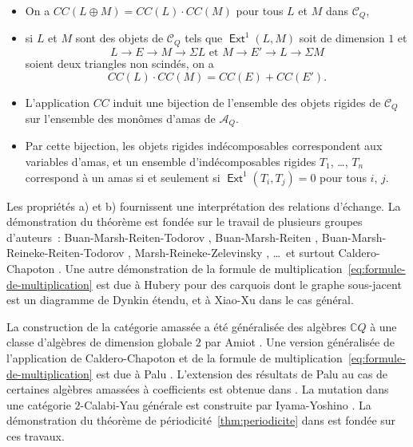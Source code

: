 \documentclass[brochure,12pt]{bourbaki}
\numberwithin{equation}{subsection}
\numberwithin{theorem}{section}
\newcommand{\opname}[1]{\operatorname{\mathsf{#1}}}
\newcommand{\C}{\mathbb{C}}
\newcommand{\Ext}{\opname{Ext}}
\newcommand{\ca}{{\mathcal A}}
\newcommand{\cc}{{\mathcal C}}
\begin{document}
\begin{theo} \label{thm:categorie-amassee-bijection}
\begin{itemize}
\item[a)] On a $CC(L\oplus M) = CC(L)\cdot CC(M)$ pour tous $L$ et $M$ dans $\cc_Q$,
\item[b)] si $L$ et $M$ sont des objets de $\cc_Q$ tels que $\Ext^1(L,M)$ soit de
dimension $1$ et
\[
L \to E \to M \to \Sigma L \mbox{ et } M \to E' \to L \to \Sigma M
\]
soient deux triangles non scind\'es, on a
\begin{equation} \label{eq:formule-de-multiplication}
CC(L) \cdot CC(M) = CC(E) + CC(E').
\end{equation}
\item[c)]
L'application $CC$ induit une bijection de l'ensemble des objets rigides de $\cc_Q$
sur l'ensemble des mon\^omes d'amas de $\ca_Q$.
\item[d)] Par cette bijection, les
objets rigides ind\'ecomposables correspondent aux variables d'amas, et
un ensemble d'ind\'ecomposables rigides $T_1$, \ldots, $T_n$
correspond \`a un amas si et seulement si $\Ext^1(T_i,T_j)=0$ pour tous $i$, $j$.
\end{itemize}
\end{theo}

Les propri\'et\'es a) et b) fournissent une interpr\'etation
des relations d'\'echange.
La d\'emonstration du th\'eor\`eme est fond\'ee sur le travail de
plusieurs groupes d'auteurs~:
Buan-Marsh-Reiten-Todorov \cite{BuanMarshReitenTodorov07},
Buan-Marsh-Reiten \cite{BuanMarshReiten08},
Buan-Marsh-Reineke-Reiten-Todorov \cite{BuanMarshReinekeReitenTodorov06},
Marsh-Reineke-Zelevinsky \cite{MarshReinekeZelevinsky03},
\ldots\ et surtout Caldero-Chapoton \cite{CalderoChapoton06}.
Une autre d\'emonstration  de la
formule de multiplication~\ref{eq:formule-de-multiplication} est due
\`a Hubery \cite{Hubery06} pour des carquois dont le graphe
sous-jacent est un diagramme de Dynkin \'etendu, et
\`a Xiao-Xu \cite{XiaoXu07} dans le cas g\'en\'eral.

La construction de la cat\'egorie amass\'ee a \'et\'e
g\'en\'eralis\'ee des alg\`ebres $\C Q$ \`a une classe d'alg\`ebres de
dimension globale $2$ par Amiot \cite{Amiot08a}. Une version
g\'en\'eralis\'ee de l'application de Caldero-Chapoton et de la
formule de multiplication~\ref{eq:formule-de-multiplication} est due
\`a Palu \cite{Palu08a}. L'extension des r\'esultats de Palu au cas
de certaines alg\`ebres amass\'ees \`a coefficients est obtenue dans
\cite{FuKeller07}. La mutation dans une cat\'egorie $2$-Calabi-Yau
g\'en\'erale est construite par Iyama-Yoshino \cite{IyamaYoshino08}.
La d\'emonstration du th\'eor\`eme de
p\'eriodicit\'e~\ref{thm:periodicite} dans \cite{Keller08c} \cite{Keller10a} est
fond\'ee sur ces travaux.
\end{document}
